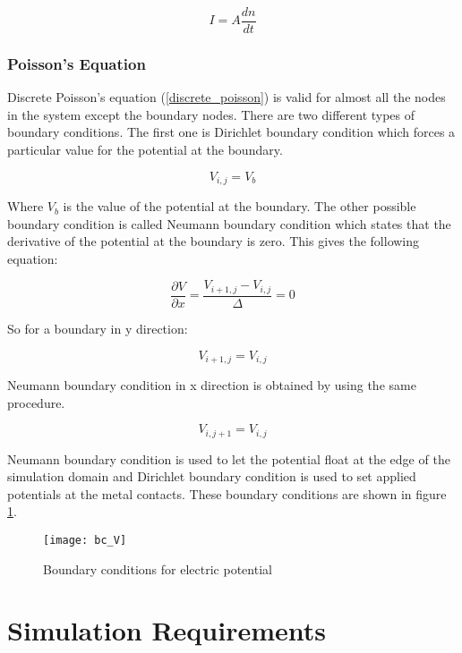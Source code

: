 \begin{doublespace}
\begin{equation}
I=A \frac{dn}{dt}
\label{current_charge_density}
\end{equation}

\subsubsection{Poisson's Equation}
Discrete Poisson's equation (\ref{discrete_poisson}) is valid for almost all the nodes in the system except the boundary nodes. There are two different types of boundary conditions. The first one is Dirichlet boundary condition which forces a particular value for the potential at the boundary.

\begin{equation}
V_{i,j}=V_{b}
\label{dirichlet}
\end{equation}

Where $V_{b}$ is the value of the potential at the boundary. The other possible boundary condition is called Neumann boundary condition which states that the derivative of the potential at the boundary is zero. This gives the following equation:

\begin{equation}
\frac{\partial V}{\partial x}=\frac{V_{i+1,j}-V_{i,j}}{\Delta}=0
\label{neumannx}
\end{equation}

So for a boundary in y direction:

\begin{equation}
V_{i+1,j}=V_{i,j}
\label{neumanny}
\end{equation}

Neumann boundary condition in x direction is obtained by using the same procedure.

\begin{equation}
V_{i,j+1}=V_{i,j}
\end{equation}

Neumann boundary condition is used to let the potential float at the edge of the simulation domain and Dirichlet boundary condition is used to set applied potentials at the metal contacts. These boundary conditions are shown in figure \ref{bc_V}.

\begin{figure}[!htp]
\centering
\texttt{[image: bc\_V]}
\caption{Boundary conditions for electric potential } 
\label{bc_V}
\end{figure}

\clearpage
\section{Simulation Requirements}


\end{doublespace}
